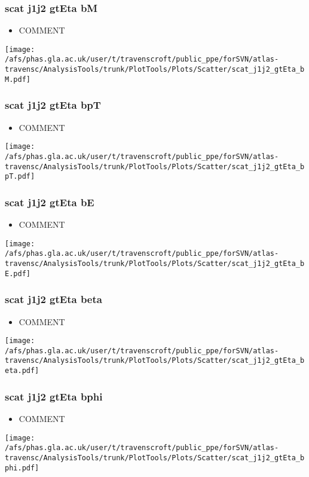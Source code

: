 \documentclass{beamer}
\begin{document}
\begin{frame}
\frametitle{scat j1j2 gtEta bM}
\begin{itemize}
\item COMMENT
\end{itemize}
\begin{center}
\texttt{[image: /afs/phas.gla.ac.uk/user/t/travenscroft/public\_ppe/forSVN/atlas-travensc/AnalysisTools/trunk/PlotTools/Plots/Scatter/scat\_j1j2\_gtEta\_bM.pdf]}
\end{center}
\end{frame}

\begin{frame}
\frametitle{scat j1j2 gtEta bpT}
\begin{itemize}
\item COMMENT
\end{itemize}
\begin{center}
\texttt{[image: /afs/phas.gla.ac.uk/user/t/travenscroft/public\_ppe/forSVN/atlas-travensc/AnalysisTools/trunk/PlotTools/Plots/Scatter/scat\_j1j2\_gtEta\_bpT.pdf]}
\end{center}
\end{frame}

\begin{frame}
\frametitle{scat j1j2 gtEta bE}
\begin{itemize}
\item COMMENT
\end{itemize}
\begin{center}
\texttt{[image: /afs/phas.gla.ac.uk/user/t/travenscroft/public\_ppe/forSVN/atlas-travensc/AnalysisTools/trunk/PlotTools/Plots/Scatter/scat\_j1j2\_gtEta\_bE.pdf]}
\end{center}
\end{frame}

\begin{frame}
\frametitle{scat j1j2 gtEta beta}
\begin{itemize}
\item COMMENT
\end{itemize}
\begin{center}
\texttt{[image: /afs/phas.gla.ac.uk/user/t/travenscroft/public\_ppe/forSVN/atlas-travensc/AnalysisTools/trunk/PlotTools/Plots/Scatter/scat\_j1j2\_gtEta\_beta.pdf]}
\end{center}
\end{frame}

\begin{frame}
\frametitle{scat j1j2 gtEta bphi}
\begin{itemize}
\item COMMENT
\end{itemize}
\begin{center}
\texttt{[image: /afs/phas.gla.ac.uk/user/t/travenscroft/public\_ppe/forSVN/atlas-travensc/AnalysisTools/trunk/PlotTools/Plots/Scatter/scat\_j1j2\_gtEta\_bphi.pdf]}
\end{center}
\end{frame}
\end{document}
